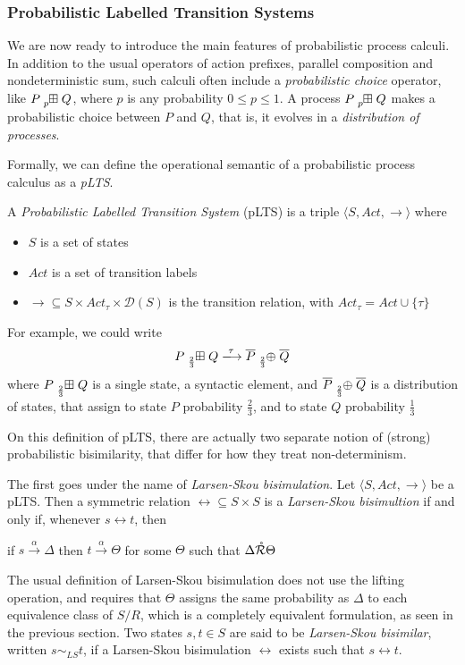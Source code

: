 \subsubsection{Probabilistic Labelled Transition Systems}

We are now ready to introduce the main features of probabilistic process calculi. In addition to the usual operators of action prefixes, parallel composition and nondeterministic sum, such calculi often include a \textit{probabilistic choice} operator, like $P \qsum{p} Q$, where $p$ is any probability $0 \leq p \leq 1$. A process $P \qsum{p} Q$ makes a probabilistic choice between $P$ and $Q$, that is, it evolves in a \textit{distribution of processes}.

Formally, we can define the operational semantic of a probabilistic process calculus as a \textit{pLTS}.
	
A \textit{Probabilistic Labelled Transition System} (pLTS) is a triple $\langle S , Act, \rightarrow \rangle$ where \begin{itemize}
\item $S$ is a set of states
\item $Act$ is a set of transition labels
\item $\rightarrow 	\subseteq S\times Act_\tau \times \mathcal{D}(S)$ is the transition relation, with $Act_\tau = Act \cup \{\tau\}$
\end{itemize} 

 For example, we could write 
\[P \qsum{\frac{2}{3}} Q \xlongrightarrow{\tau} \overline{P} \psum{\frac{2}{3}} \overline{Q}\]
where $P \qsum{\frac{2}{3}} Q$ is a single state, a syntactic element, and $\overline{P} \psum{\frac{2}{3}} \overline{Q}$ is a distribution of states, that assign to state $P$ probability $\frac{2}{3}$, and to state $Q$ probability $\frac{1}{3}$


On this definition of pLTS, there are actually two separate notion of (strong) probabilistic bisimilarity, that differ for how they treat non-determinism.

The first goes under the name of \textit{Larsen-Skou bisimulation}. Let $\langle S , Act, \rightarrow \rangle$ be a pLTS. Then a symmetric relation $\rel \subseteq S \times S$ is a \textit{Larsen-Skou bisimultion} if and only if, whenever $s \rel t$, then 
\begin{center}
if $s \xrightarrow{\alpha} \Delta$ then $t \xrightarrow{\alpha} \Theta$ for some $\Theta$ such that $\Delta \mathring{\mathcal{R}} \Theta$
\end{center}
The usual definition of Larsen-Skou bisimulation does not use the lifting operation, and requires that $\Theta$ assigns the same probability as $\Delta$ to each equivalence class of $S/R$, which is a completely equivalent formulation, as seen in the previous section. Two states $s, t \in S$ are said to be \textit{Larsen-Skou bisimilar}, written $s \sim_{LS} t$, if a Larsen-Skou bisimulation $\rel$ exists such that $s \rel t$.

